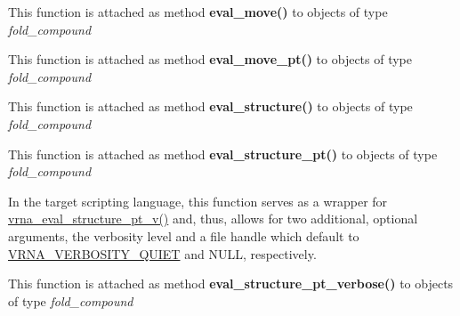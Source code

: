 \begin{DoxyRefList}
\item[\label{wrappers__wrappers000037}%
\Hypertarget{wrappers__wrappers000037}%
Global \hyperlink{group__eval__move_gaff1b9e4f4d17b434b0a822fe783672c1}{vrna\+\_\+eval\+\_\+move} (vrna\+\_\+fold\+\_\+compound\+\_\+t $\ast$vc, const char $\ast$structure, int m1, int m2)]This function is attached as method {\bfseries eval\+\_\+move()} to objects of type {\itshape fold\+\_\+compound}  
\item[\label{wrappers__wrappers000038}%
\Hypertarget{wrappers__wrappers000038}%
Global \hyperlink{group__eval__move_ga123dabc119ea98c968a5e903cc46f0fb}{vrna\+\_\+eval\+\_\+move\+\_\+pt} (vrna\+\_\+fold\+\_\+compound\+\_\+t $\ast$vc, short $\ast$pt, int m1, int m2)]This function is attached as method {\bfseries eval\+\_\+move\+\_\+pt()} to objects of type {\itshape fold\+\_\+compound}  
\item[\label{wrappers__wrappers000031}%
\Hypertarget{wrappers__wrappers000031}%
Global \hyperlink{group__eval_ga58f199f1438d794a265f3b27fc8ea631}{vrna\+\_\+eval\+\_\+structure} (vrna\+\_\+fold\+\_\+compound\+\_\+t $\ast$vc, const char $\ast$structure)]This function is attached as method {\bfseries eval\+\_\+structure()} to objects of type {\itshape fold\+\_\+compound}  
\item[\label{wrappers__wrappers000032}%
\Hypertarget{wrappers__wrappers000032}%
Global \hyperlink{group__eval_gadbd09372ddfd7a450bbd590c96a6bfe4}{vrna\+\_\+eval\+\_\+structure\+\_\+pt} (vrna\+\_\+fold\+\_\+compound\+\_\+t $\ast$vc, const short $\ast$pt)]This function is attached as method {\bfseries eval\+\_\+structure\+\_\+pt()} to objects of type {\itshape fold\+\_\+compound}  
\item[\label{wrappers__wrappers000059}%
\Hypertarget{wrappers__wrappers000059}%
Global \hyperlink{group__eval_ga0bba59b4d6e53461088666ff4aece7b0}{vrna\+\_\+eval\+\_\+structure\+\_\+pt\+\_\+simple} (const char $\ast$string, const short $\ast$pt)]In the target scripting language, this function serves as a wrapper for \hyperlink{group__eval_ga2c6533ba0afe4c88d335d8f1e0e2a48e}{vrna\+\_\+eval\+\_\+structure\+\_\+pt\+\_\+v()} and, thus, allows for two additional, optional arguments, the verbosity level and a file handle which default to \hyperlink{group__eval_gaf4afe19780b61b4962c613bde324128b}{V\+R\+N\+A\+\_\+\+V\+E\+R\+B\+O\+S\+I\+T\+Y\+\_\+\+Q\+U\+I\+ET} and N\+U\+LL, respectively.  
\item[\label{wrappers__wrappers000034}%
\Hypertarget{wrappers__wrappers000034}%
Global \hyperlink{group__eval_ga8a517cfeeae8c376ae7b1e0c401d38b4}{vrna\+\_\+eval\+\_\+structure\+\_\+pt\+\_\+verbose} (vrna\+\_\+fold\+\_\+compound\+\_\+t $\ast$vc, const short $\ast$pt, F\+I\+LE $\ast$file)]This function is attached as method {\bfseries eval\+\_\+structure\+\_\+pt\+\_\+verbose()} to objects of type {\itshape fold\+\_\+compound}  

\end{DoxyRefList}
